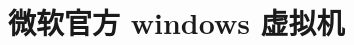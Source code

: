 \documentclass{book}
\begin{document}

\chapter{微软官方 windows 虚拟机}




















% 
\end{document}
